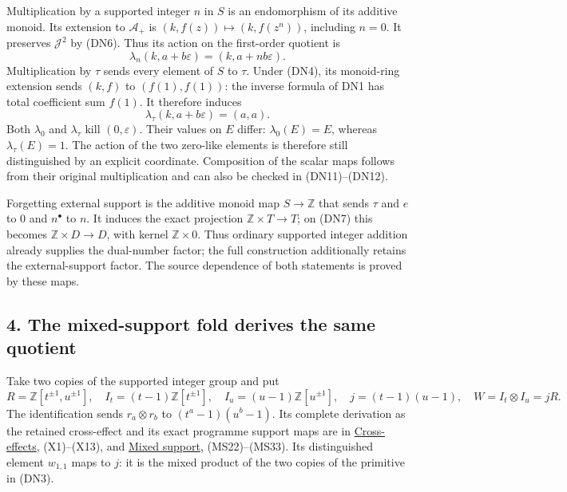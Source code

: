 \documentclass[
]{article}
\begin{document}
Multiplication by a supported integer \(n\) in \(S\) is an endomorphism
of its additive monoid. Its extension to \(\mathcal A_+\) is
\((k,f(z))\mapsto(k,f(z^n))\), including \(n=0\). It preserves
\(\mathcal J^2\) by (DN6). Thus its action on the first-order quotient
is \[
\lambda_n(k,a+b\varepsilon)=(k,a+nb\varepsilon).
\tag{DN11}
\] Multiplication by \(\tau\) sends every element of \(S\) to \(\tau\).
Under (DN4), its monoid-ring extension sends \((k,f)\) to
\((f(1),f(1))\): the inverse formula of DN1 has total coefficient sum
\(f(1)\). It therefore induces \[
\lambda_\tau(k,a+b\varepsilon)=(a,a).
\tag{DN12}
\] Both \(\lambda_0\) and \(\lambda_\tau\) kill \((0,\varepsilon)\).
Their values on \(E\) differ: \(\lambda_0(E)=E\), whereas
\(\lambda_\tau(E)=1\). The action of the two zero-like elements is
therefore still distinguished by an explicit coordinate. Composition of
the scalar maps follows from their original multiplication and can also
be checked in (DN11)--(DN12).

Forgetting external support is the additive monoid map \(S\to\mathbb Z\)
that sends \(\tau\) and \(e\) to 0 and \(n^\bullet\) to \(n\). It
induces the exact projection \(\mathbb Z\times T\to T\); on (DN7) this
becomes \(\mathbb Z\times D\to D\), with kernel \(\mathbb Z\times0\).
Thus ordinary supported integer addition already supplies the
dual-number factor; the full construction additionally retains the
external-support factor. The source dependence of both statements is
proved by these maps.

\subsection{4. The mixed-support fold derives the same
quotient}\label{the-mixed-support-fold-derives-the-same-quotient}

Take two copies of the supported integer group and put \[
R=\mathbb Z[t^{\pm1},u^{\pm1}],\quad
I_t=(t-1)\mathbb Z[t^{\pm1}],\quad I_u=(u-1)\mathbb Z[u^{\pm1}],
\quad j=(t-1)(u-1),\quad W=I_t\otimes I_u=jR.
\tag{DN13}
\] The identification sends \(r_a\otimes r_b\) to \((t^a-1)(u^b-1)\).
Its complete derivation as the retained cross-effect and its exact
programme support maps are in
\href{https://github.com/KokunoYumeto/zeta-function-research-reader/blob/6af54ea3c8ef99127af327f3103e086c68d482c2/workbenches/splitzero-tandem/branches/identity-absorber-square/CROSS_EFFECTS.md}{Cross-effects},
(X1)--(X13), and
\href{https://github.com/KokunoYumeto/zeta-function-research-reader/blob/6af54ea3c8ef99127af327f3103e086c68d482c2/workbenches/splitzero-tandem/branches/identity-absorber-square/MIXED_SUPPORT.md}{Mixed
support}, (MS22)--(MS33). Its distinguished element \(w_{1,1}\) maps to
\(j\): it is the mixed product of the two copies of the primitive in
(DN3).
\end{document}
